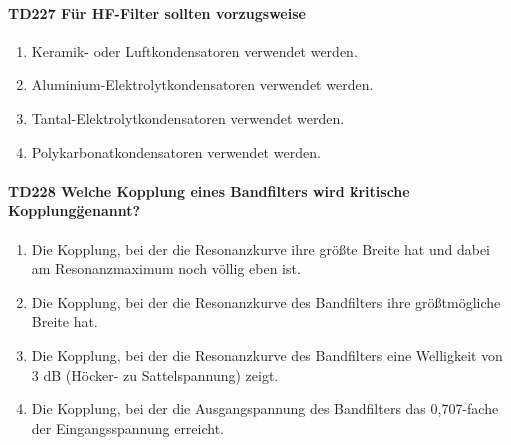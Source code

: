 \documentclass[8pt]{article}
\begin{document}
\begin{enumerate}
\begin{enumerate}[nolistsep,label=\Alph*]
{\paragraph*{TD227 Für HF-Filter sollten vorzugsweise}
\begin{enumerate}[nolistsep,label=\Alph*]
\item Keramik- oder Luftkondensatoren verwendet werden.
\item Aluminium-Elektrolytkondensatoren verwendet werden.
\item Tantal-Elektrolytkondensatoren verwendet werden.
\item Polykarbonatkondensatoren verwendet werden.
\end{enumerate}

\paragraph*{TD228 Welche Kopplung eines Bandfilters wird \"kritische Kopplung\" genannt?}
\begin{enumerate}[nolistsep,label=\Alph*]
\item Die Kopplung, bei der die Resonanzkurve ihre größte Breite hat und dabei am Resonanzmaximum noch völlig eben ist.
\item Die Kopplung, bei der die Resonanzkurve des Bandfilters ihre größtmögliche Breite hat.
\item Die Kopplung, bei der die Resonanzkurve des Bandfilters eine Welligkeit von 3 dB (Höcker- zu Sattelspannung) zeigt. 
\item Die Kopplung, bei der die Ausgangspannung des Bandfilters das 0,707-fache der Eingangsspannung erreicht.
\end{enumerate}

}
\end{enumerate}
\end{enumerate}
\end{document}
